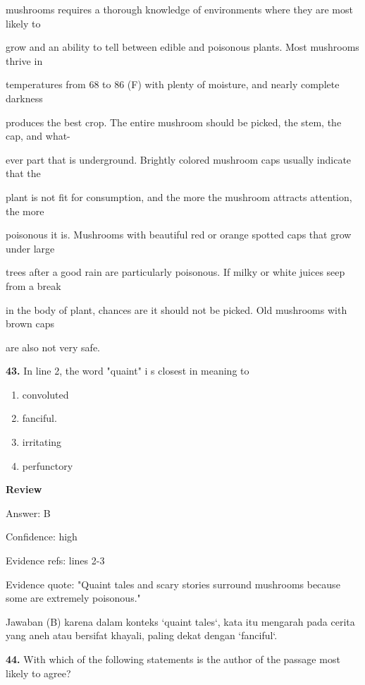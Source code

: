 \documentclass[12pt]{article}
\begin{document}
mushrooms requires a thorough knowledge of environments where they are most likely to\par
grow and an ability to tell between edible and poisonous plants. Most mushrooms thrive in\par
temperatures from 68 to 86 (F) with plenty of moisture, and nearly complete darkness\par
produces the best crop. The entire mushroom should be picked, the stem, the cap, and what-\par
ever part that is underground. Brightly colored mushroom caps usually indicate that the\par
plant is not fit for consumption, and the more the mushroom attracts attention, the more\par
poisonous it is. Mushrooms with beautiful red or orange spotted caps that grow under large\par
trees after a good rain are particularly poisonous. If milky or white juices seep from a break\par
in the body of plant, chances are it should not be picked. Old mushrooms with brown caps\par
are also not very safe.\par
\endgroup
\medskip
\noindent\textbf{43.} In line 2, the word "quaint" i s closest in meaning to
\begin{enumerate}[label=(\Alph*),leftmargin=*,itemsep=0.2em]
\item convoluted
\item fanciful.
\item irritating
\item perfunctory
\end{enumerate}
\par
\begingroup
\setlength{\parskip}{0pt}
\setlength{\parindent}{0pt}
\textbf{Review}\par
Answer: B\par
Confidence: high\par
Evidence refs: lines 2-3\par
Evidence quote: "Quaint tales and scary stories surround mushrooms because some are extremely poisonous."\par
Jawaban (B) karena dalam konteks `quaint tales`, kata itu mengarah pada cerita yang aneh atau bersifat khayali, paling dekat dengan `fanciful`.\par
\endgroup
\par
\vspace{0.25\baselineskip}
\noindent\textbf{44.} With which of the following statements is the author of the passage most likely to agree?
\end{document}
